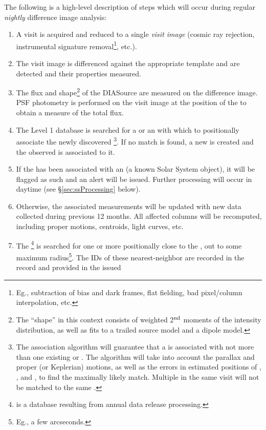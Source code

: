 The following is a high-level description of steps which will occur during regular {\em nightly}
difference image analysis:
\begin{enumerate}
\item A visit is acquired and reduced to a single {\em visit image} (cosmic ray rejection, instrumental signature removal\footnote{Eg., subtraction of bias and dark frames, flat fielding, bad pixel/column interpolation, etc.}, etc.).
\item The visit image is differenced against the appropriate template and \DIASources are detected and
their properties measured.
\item The flux and shape\footnote{The ``shape'' in this context consists of weighted 2$^{\rm nd}$ moments
of the intensity distribution, as well as fits to a trailed source model and a dipole model.} of the DIASource are measured on the difference image. PSF photometry is performed on the visit image at the position of the \DIASource to obtain a measure of the total flux.
\item The Level 1 database is searched for a \DIAObject or an \SSObject with which to positionally associate the newly discovered \DIASource\footnote{The association algorithm will guarantee that a \DIASource is associated with not more than one existing \DIAObject or \SSObject. The algorithm will take into account the parallax and proper (or Keplerian) motions, as well as the errors in estimated positions of \DIAObject, \SSObject, and \DIASource, to find the maximally likely match. Multiple \DIASources in the same visit will not be matched to the same \DIAObject.}. If no match is found, a new \DIAObject is created and the observed \DIASource is associated to it.
\item If the \DIASource has been associated with an \SSObject (a known Solar System object), it will be flagged as such and an alert will be issued. Further processing will occur in daytime (see \S\ref{sec:ssProcessing} below).
\item Otherwise, the associated \DIAObject measurements will be updated with new data
collected during previous 12 months. All affected columns will be recomputed, including proper motions, centroids, light curves, etc.
\item The \DR\footnote{\DR is a database resulting from annual data release processing.} is searched for one or more \Objects positionally close to the \DIAObject, out to some maximum radius\footnote{Eg., a few arcseconds.}. The IDs of these nearest-neighbor \Objects are recorded in the \DIAObject record and provided in the issued

\end{enumerate}
